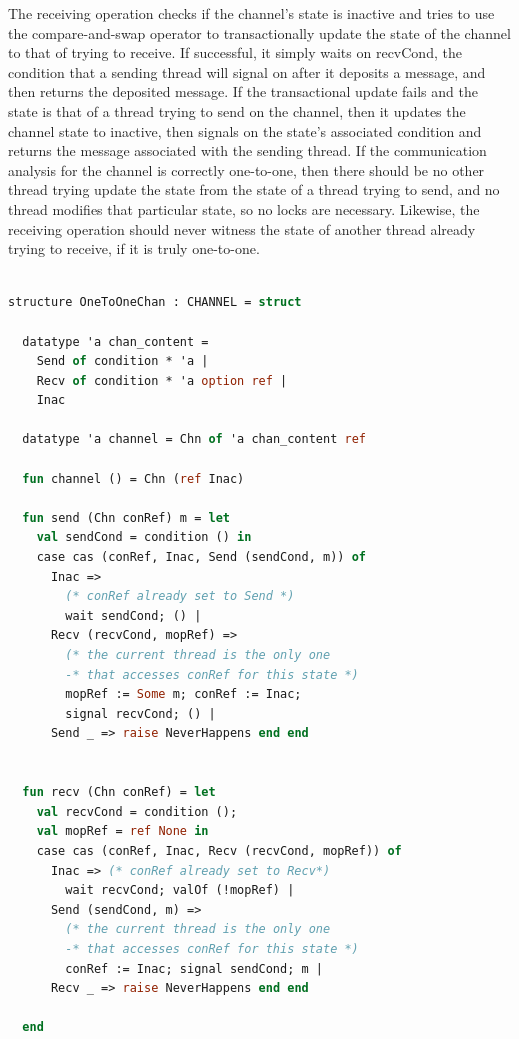 \documentclass{article}
\begin{document}
The receiving operation checks if the channel's state is inactive and tries to use the
compare-and-swap operator to transactionally update the state of the channel to that of trying
to receive.  If successful, it simply waits on recvCond, the condition that a sending thread
will signal on after it deposits a message, and then returns the deposited message.  If the
transactional update fails and the state is that of a thread trying to send on the channel,
then it updates the channel state to inactive, then signals on the state's associated
condition and returns the message associated with the sending thread.  If the communication
analysis for the channel is correctly one-to-one, then there should be no other thread trying
update the state from the state of a thread trying to send, and no thread modifies that
particular state, so no locks are necessary.  Likewise, the receiving operation should never
witness the state of another thread already trying to receive, if it is truly one-to-one.

\begin{lstlisting}[language=ML, mathescape]

structure OneToOneChan : CHANNEL = struct

  datatype 'a chan_content =
    Send of condition * 'a |
    Recv of condition * 'a option ref |
    Inac  

  datatype 'a channel = Chn of 'a chan_content ref

  fun channel () = Chn (ref Inac)

  fun send (Chn conRef) m = let
    val sendCond = condition () in
    case cas (conRef, Inac, Send (sendCond, m)) of
      Inac => 
        (* conRef already set to Send *)
        wait sendCond; () |
      Recv (recvCond, mopRef) =>
        (* the current thread is the only one
        -* that accesses conRef for this state *)
        mopRef := Some m; conRef := Inac;
        signal recvCond; () |
      Send _ => raise NeverHappens end end


  fun recv (Chn conRef) = let
    val recvCond = condition ();
    val mopRef = ref None in
    case cas (conRef, Inac, Recv (recvCond, mopRef)) of
      Inac => (* conRef already set to Recv*)
        wait recvCond; valOf (!mopRef) |
      Send (sendCond, m) =>
        (* the current thread is the only one
        -* that accesses conRef for this state *)
        conRef := Inac; signal sendCond; m |
      Recv _ => raise NeverHappens end end 

  end
  \end{lstlisting}
\end{document}
